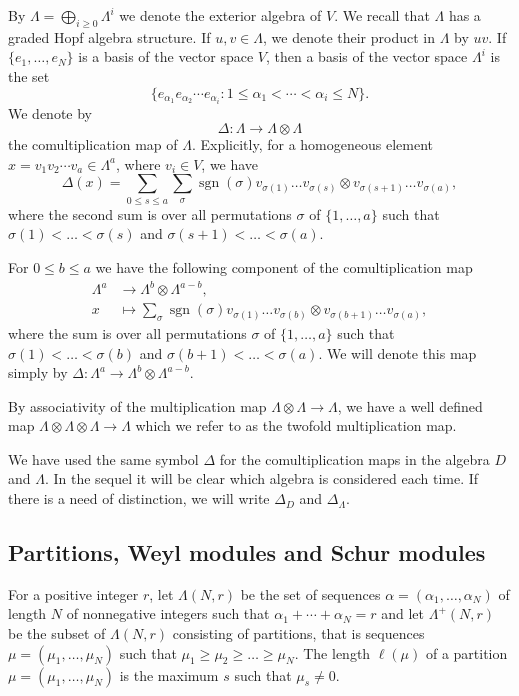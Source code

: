 \documentclass[11pt]{amsart}
\theoremstyle{definition}
\numberwithin{equation}{section}
\DeclareMathOperator{\sign}{sgn}
\begin{document}
By $\Lambda = \bigoplus_{i \ge 0} \Lambda^i$ we denote the exterior algebra of $V$. We recall that $\Lambda$ has a graded Hopf algebra structure. If $u,v \in \Lambda$, we denote their product in  $\Lambda$ by $uv$. If $\{e_1, \dots, e_N\}$ is a basis of the vector space $V$, then a basis of the vector space $\Lambda^i$ is the set \[\{e_{\alpha_1} e_{\alpha_{2}}\cdots  e_{\alpha_i}: 1 \le \alpha_1 < \cdots < \alpha_i \le N\}.\] We denote by \[\Delta : \Lambda \to \Lambda \otimes \Lambda\] the comultiplication map of $\Lambda$. Explicitly, for a homogeneous element $x= v_{1} v_{2}\cdots  v_{a} \in \Lambda^a$, where $v_i \in V$, we have \[ \Delta(x)=\sum_{0 \le s \le a}\sum_{\sigma} \sign(\sigma)v_{\sigma(1)} \dots v_{\sigma(s)} \otimes v_{\sigma(s+1)} \dots v_{\sigma(a)},\] where the second sum is over all permutations $\sigma$ of $\{1, \dots, a\}$ such that $\sigma(1) < \dots <\sigma(s)$ and $\sigma(s+1) < \dots < \sigma(a)$.

For $0 \le b \le a$ we have the following component of the comultiplication map \begin{align*} \Lambda^a &\to \Lambda^b \otimes \Lambda^{a-b}, \\  x &\mapsto \sum_{\sigma} \sign(\sigma)v_{\sigma(1)} \dots v_{\sigma(b)} \otimes v_{\sigma(b+1)} \dots v_{\sigma(a)}, \end{align*} where the sum is over all permutations $\sigma$ of $\{1, \dots, a\}$ such that $\sigma(1) < \dots <\sigma(b)$ and $\sigma(b+1) < \dots < \sigma(a)$. We will  denote this map simply by $\Delta:  \Lambda^a \to \Lambda^b \otimes \Lambda^{a-b}$.

By associativity of the multiplication map $\Lambda \otimes \Lambda \to \Lambda$, we have a well defined map $\Lambda \otimes \Lambda \otimes \Lambda \to \Lambda$ which we refer to as the twofold multiplication map.

We have used the same symbol $\Delta$ for the comultiplication maps in the algebra $D$ and $\Lambda$. In the sequel it will be clear which algebra is considered each time. If there is a need of distinction, we will write $\Delta_D$ and $\Delta_\Lambda$.



\subsection{Partitions, Weyl modules and Schur modules}For a positive integer $r$, let $\Lambda(N,r)$ be the set of sequences $\alpha=(\alpha_1, \dots, \alpha_N)$ of length $N$ of nonnegative integers such that $\alpha_1+\cdots +\alpha_N= r$ and let  $\Lambda^+(N,r)$ be the subset of $\Lambda(N,r)$ consisting of partitions, that is sequences $\mu=(\mu_1, \dots, \mu_N)$ such that $\mu_1 \ge \mu_2 \ge \dots \ge \mu_N$. The length $\ell(\mu)$ of a partition $\mu=(\mu_1, \dots, \mu_N)$ is the maximum $s$ such that $\mu_s \neq 0$.
\end{document}
